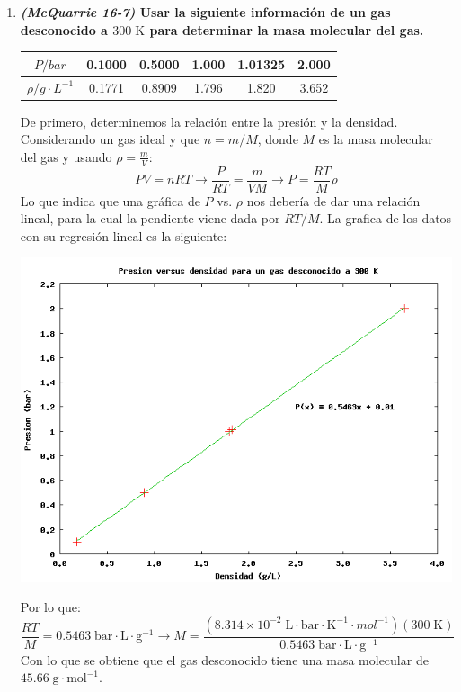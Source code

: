 \documentclass[a4paper,12pt]{article}
\begin{document}
\begin{enumerate}
\newpage

 \item \textbf{\textit{(McQuarrie 16-7)} Usar la siguiente informaci\'on de un gas desconocido a $300\;\mbox{K}$ para determinar la masa molecular del gas.} %

\begin{center}
\begin{tabular}{c|c c c c c}
$P/bar$ & 0.1000 & 0.5000 & 1.000 & 1.01325 & 2.000 \\\hline
$\rho/g\cdot L^{-1}$ & 0.1771 & 0.8909 & 1.796 & 1.820 & 3.652 
\end{tabular}
\end{center}

De primero, determinemos la relaci\'on entre la presi\'on y la densidad. Considerando un gas ideal y que $n=m/M$, donde $M$ es la masa molecular del gas y usando $\rho=\frac{m}{V}$:
$$PV=nRT\rightarrow \frac{P}{RT}=\frac{m}{VM}\rightarrow P=\frac{RT}{M}\rho$$
Lo que indica que una gr\'afica de $P$ vs. $\rho$ nos deber\'ia de dar una relaci\'on lineal, para la cual la pendiente viene dada por $RT/M$. La grafica de los datos con su regresi\'on lineal es la siguiente:
\begin{center}
 \includegraphics[scale=0.9]{figure1}
\end{center}
Por lo que: 
$$\frac{RT}{M}=0.5463\;\mbox{bar}\cdot\mbox{L}\cdot\mbox{g}^{-1}\rightarrow M=\frac{(8.314\times 10^{-2}\;\mbox{L}\cdot\mbox{bar}\cdot\mbox{K}^{-1}\cdot{mol}^{-1})(300\;\mbox{K})}{0.5463\;\mbox{bar}\cdot\mbox{L}\cdot\mbox{g}^{-1}}$$
Con lo que se obtiene que el gas desconocido tiene una masa molecular de $45.66\;\mbox{g}\cdot\mbox{mol}^{-1}$.

\end{enumerate}
 
\end{document}
